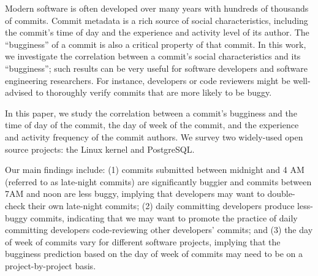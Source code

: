 
Modern software is often developed over many years with hundreds of
thousands of commits. Commit metadata is a rich source of social
characteristics, including the commit's time of day and the
experience and activity level of its author.  The ``bugginess'' of a
commit is also a critical property of that commit.  In this work, we
investigate the correlation between a commit's social characteristics
and its ``bugginess''; such results can be very useful for software
developers and software engineering researchers. For instance,
developers or code reviewers might be well-advised to thoroughly
verify commits that are more likely to be buggy.

In this paper, we study the correlation between a commit's bugginess
and the time of day of the commit, the day of week of the commit, and
the experience and activity frequency of the commit authors.  We
survey two widely-used open source projects: the Linux kernel and
PostgreSQL.  

Our main findings include: (1) commits submitted between midnight and
4 AM (referred to as late-night commits) are significantly buggier 
and commits between 7AM and noon are less buggy, implying that developers 
may want to double-check their own late-night commits; 
(2) daily committing developers produce less-buggy commits, indicating that we may 
want to promote the practice of daily committing developers code-reviewing other 
developers' commits; and (3) 
the day of week of commits
vary for different software projects, implying that the bugginess prediction based on 
the day of week of commits may need to be on a project-by-project basis.
